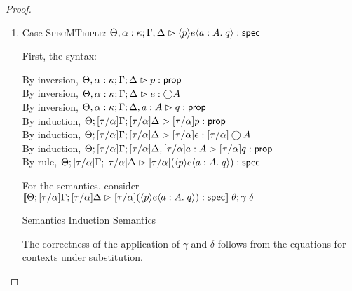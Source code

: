 \begin{proof}
\begin{enumerate}
\item Case \textsc{SpecMTriple}: $\judgeS[\Theta, \alpha:\kappa; \Gamma; \Delta]{\mspec{p}{e}{a:A}{q}}$
  
  First, the syntax:
  \begin{tabbedproof}
    \oo By inversion, $\judgeA[\Theta, \alpha:\kappa; \Gamma; \Delta]{p}{\assert}$ \\
    \oo By inversion, $\judgeA[\Theta, \alpha:\kappa; \Gamma; \Delta]{e}{\monad{A}}$ \\
    \oo By inversion, $\judgeA[\Theta, \alpha:\kappa; \Gamma; \Delta, a:A]{q}{\assert}$ \\
    \oo By induction, $\judgeA[\Theta; {[\tau/\alpha]}\Gamma; {[\tau/\alpha]}\Delta]{{[\tau/\alpha]}p}{\assert}$ \\
    \oo By induction, $\judgeA[\Theta; {[\tau/\alpha]}\Gamma; {[\tau/\alpha]}\Delta]{{[\tau/\alpha]}e}{{[\tau/\alpha]}\monad{A}}$ \\
    \oo By induction, $\judgeA[\Theta; {[\tau/\alpha]}\Gamma; {[\tau/\alpha]}\Delta, {[\tau/\alpha]}a:A]{{[\tau/\alpha]}q}{\assert}$ \\
    \oo By rule, $\judgeS[\Theta; {[\tau/\alpha]}\Gamma; {[\tau/\alpha]}\Delta]{{[\tau/\alpha]}(\mspec{p}{e}{a:A}{q})}$
  \end{tabbedproof}

  For the semantics, consider $\interp{\judgeS[\Theta; {[\tau/\alpha]}\Gamma; {[\tau/\alpha]}\Delta]{{[\tau/\alpha]}(\mspec{p}{e}{a:A}{q})}}\;\theta;\gamma\;\delta$
  \begin{eqnproof}
          {Semantics}
          {Induction}
          {Semantics}
  \end{eqnproof}
  The correctness of the application of $\gamma$ and $\delta$ follows from the equations for
  contexts under substitution. 


\end{enumerate}
\end{proof}
